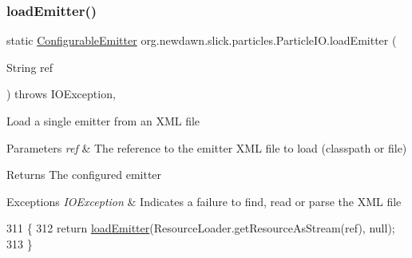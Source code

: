\mbox{\label{classorg_1_1newdawn_1_1slick_1_1particles_1_1_particle_i_o_af2afc8b074ac941f5b987b1396747a0f}} 
\subsubsection{\texorpdfstring{load\+Emitter()}{loadEmitter()}\hspace{0.1cm}{\footnotesize\ttfamily [1/6]}}
{\footnotesize\ttfamily static \mbox{\hyperlink{classorg_1_1newdawn_1_1slick_1_1particles_1_1_configurable_emitter}{Configurable\+Emitter}} org.\+newdawn.\+slick.\+particles.\+Particle\+I\+O.\+load\+Emitter (\begin{DoxyParamCaption}\item[{String}]{ref }\end{DoxyParamCaption}) throws I\+O\+Exception\hspace{0.3cm}{\ttfamily [inline]}, {\ttfamily [static]}}

Load a single emitter from an X\+ML file


\begin{DoxyParams}{Parameters}
{\em ref} & The reference to the emitter X\+ML file to load (classpath or file) \\
\hline
\end{DoxyParams}
\begin{DoxyReturn}{Returns}
The configured emitter 
\end{DoxyReturn}

\begin{DoxyExceptions}{Exceptions}
{\em I\+O\+Exception} & Indicates a failure to find, read or parse the X\+ML file \\
\hline
\end{DoxyExceptions}

\begin{DoxyCode}
311                                \{
312         \textcolor{keywordflow}{return} \mbox{\hyperlink{classorg_1_1newdawn_1_1slick_1_1particles_1_1_particle_i_o_af2afc8b074ac941f5b987b1396747a0f}{loadEmitter}}(ResourceLoader.getResourceAsStream(ref), null);
313     \}
\end{DoxyCode}
\mbox{\label{classorg_1_1newdawn_1_1slick_1_1particles_1_1_particle_i_o_a4cc2ae308ef94ca524cda6af6f692550}} 
